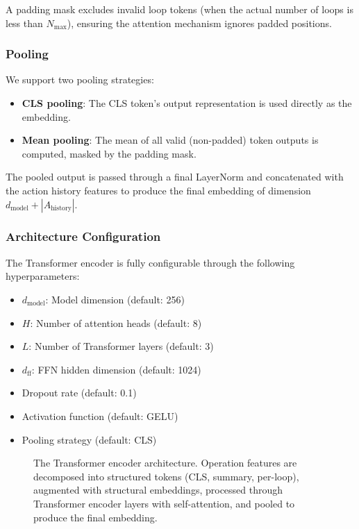 \documentclass[10pt,twocolumn]{article}
\begin{document}
A padding mask excludes invalid loop tokens (when the actual number of loops is less than $N_{\max}$), ensuring the attention mechanism ignores padded positions.

\subsubsection{Pooling}

We support two pooling strategies:
\begin{itemize}
\item \textbf{CLS pooling}: The CLS token's output representation is used directly as the embedding.
\item \textbf{Mean pooling}: The mean of all valid (non-padded) token outputs is computed, masked by the padding mask.
\end{itemize}

The pooled output is passed through a final LayerNorm and concatenated with the action history features to produce the final embedding of dimension $d_{\text{model}} + |A_{\text{history}}|$.

\subsubsection{Architecture Configuration}

The Transformer encoder is fully configurable through the following hyperparameters:
\begin{itemize}
\item $d_{\text{model}}$: Model dimension (default: 256)
\item $H$: Number of attention heads (default: 8)
\item $L$: Number of Transformer layers (default: 3)
\item $d_{\text{ff}}$: FFN hidden dimension (default: 1024)
\item Dropout rate (default: 0.1)
\item Activation function (default: GELU)
\item Pooling strategy (default: CLS)
\end{itemize}

\begin{figure}[t]
\centering
{}
\caption{The Transformer encoder architecture. Operation features are decomposed into structured tokens (CLS, summary, per-loop), augmented with structural embeddings, processed through Transformer encoder layers with self-attention, and pooled to produce the final embedding.}
\label{fig:transformer}
\end{figure}
\end{document}
